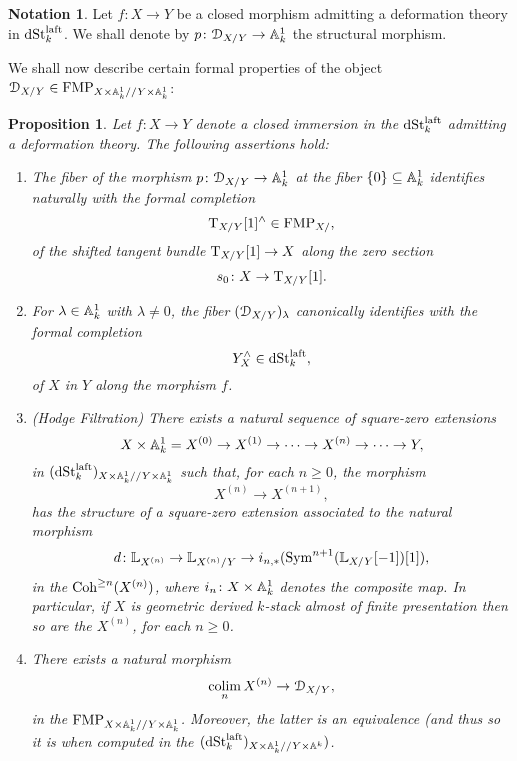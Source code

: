 \documentclass[10pt,a4paper,reqno]{amsart} %
\theoremstyle{plain}
\newtheorem{prop}[thm]{Proposition}
\theoremstyle{definition}
\newtheorem{notation}[thm]{Notation}
\theoremstyle{remark}
\numberwithin{equation}{section}
\begin{document}
\begin{notation}
    Let $f \colon X \to Y$ be a closed morphism admitting a deformation theory in $\mathrm{dSt}_k^{\mathrm{laft}}$. We shall denote by $p \colon \mathcal D_{X/ Y} \to \mathbb A^1_k$ the structural
    morphism.
\end{notation}

We shall now describe certain formal properties of the object $\mathcal D_{X/Y} \in \mathrm{FMP}_{X \times \mathbb A^1_k/ /Y \times \mathbb A^1_k}$:

\begin{prop} \label{prop:algebraic_properties_of_deformation} Let $f \colon X \to Y$ denote a closed immersion in the \infcat $\mathrm{dSt}_k^{\mathrm{laft}}$ admitting a deformation theory.
    The following assertions hold:
    \begin{enumerate}
        \item The fiber of the morphism $p \colon \mathcal D_{X/Y} \to \mathbb A^1_k$ at the fiber $\{0 \} \subseteq \mathbb A^1_k$ identifies naturally with
        the formal completion 
            \[\mathrm T_{X/Y}[1]^\wedge \in \mathrm{FMP}_{X/ },\]
        of the shifted tangent bundle $\mathrm T_{X/Y}[1] \to X$ along the
        zero section
            \[
                s_0 \colon X \to \mathrm T_{X/Y}[1].  
            \]
        \item For $\lambda \in \mathbb A^1_k$ with $\lambda \neq 0$, the fiber $(\mathcal D_{X/Y})_{\lambda}$ canonically identifies with the formal completion
            \[
                Y^\wedge_X \in \mathrm{dSt}^{\mathrm{laft}}_k,  
            \]
        of $X$ in $Y$ along the morphism $f$.
        \item (Hodge Filtration) There exists a natural sequence of square-zero extensions
            \[
                X \times \mathbb A^1_k = X^{(0)} \to X^{(1)}  \to  \dots \to X^{(n)} \to \dots \to Y,
            \]
        in $(\mathrm{dSt}_k^{\mathrm{laft}})_{X\times\mathbb A^1_k/ /Y\times\mathbb A^1_k}$ such that, for each $n \ge 0$, the morphism
            \[
                X^{(n)} \to X^{(n+1)},  
            \]
        has the structure of a square-zero extension associated to the natural morphism
            \[d \colon \mathbb L_{X^{(n)}} \to \mathbb L_{X^{(n)}/ Y} \to i_{n, *} (\operatorname{Sym}^{n+1}(\mathbb L_{X/ Y}[-1])[1]),\]
        in the \infcat $\mathrm{Coh}^{\ge n}(X^{(n)})$, where $i_n \colon X \times \mathbb A^1_k$ denotes the composite map.
        In particular, if $X$ is geometric derived $k$-stack almost of finite presentation then so are the $X^{(n)}$, for each $n \ge 0$.
        \item There exists a natural morphism
            \[\operatorname*{colim}_{n} X^{(n)} \to \mathcal D_{X/Y},\]
        in the \infcat $\mathrm{FMP}_{X \times \mathbb A^1_k/ /Y\times\mathbb A^1_k}$. Moreover, the latter is an equivalence
        (and thus so it is when computed in the \infcat $(\mathrm{dSt}_k^{\mathrm{laft}})_{X\times\mathbb A^1_k/ /Y\times\mathbb A^k})$.
    \end{enumerate}
\end{prop}
\end{document}
